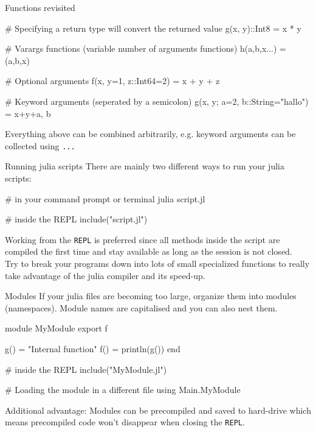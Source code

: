 \documentclass{beamer}
\newenvironment{Boxx}{\begin{tcolorbox}[standard jigsaw, opacityframe=0.8, opacityback=0.0]}{\end{tcolorbox}}
\begin{document}
\begin{frame}[fragile]{Functions revisited}

	\begin{Boxx}
		\begin{jllisting}
  # Specifying a return type will convert the returned value	
  g(x, y)::Int8 = x * y
  
  # Varargs functions (variable number of arguments functions)
  h(a,b,x...) = (a,b,x)
  
  # Optional arguments
  f(x, y=1, z::Int64=2) = x + y + z
  
  # Keyword arguments (seperated by a semicolon)
  g(x, y; a=2, b::String="hallo") = x+y+a, b
		\end{jllisting}
	\end{Boxx}
Everything above can be combined arbitrarily, e.g. keyword arguments can be collected using \verb|...|

	
\end{frame}


\begin{frame}[fragile]{Running julia scripts}
	There are mainly two different ways to run your julia scripts:
	\begin{Boxx}
 \begin{jllisting}
  # in your command prompt or terminal
  julia script.jl
  
  # inside the REPL
  include("script.jl")
\end{jllisting}
\end{Boxx}
Working from the \verb|REPL| is preferred since all methods inside the script are compiled the first time and stay available as long as the session is not closed.\\

\vspace{4mm}
Try to break your programs down into lots of small specialized functions to really take advantage of the julia compiler and its speed-up.
\end{frame}


\begin{frame}[fragile]{Modules}
If your julia files are becoming too large, organize them into modules (namespaces). Module names are capitalised and you can also nest them.
\begin{Boxx}
  \begin{jllisting}
  module MyModule
    export f

    g() = "Internal function"
    f() = println(g())
  end
  
  # inside the REPL
  include("MyModule.jl")
  
  # Loading the module in a different file
  using Main.MyModule
  \end{jllisting}
\end{Boxx}
Additional advantage: Modules can be precompiled and saved to hard-drive which means precompiled code won't disappear when closing the \verb|REPL|.
\end{frame}
\end{document}
